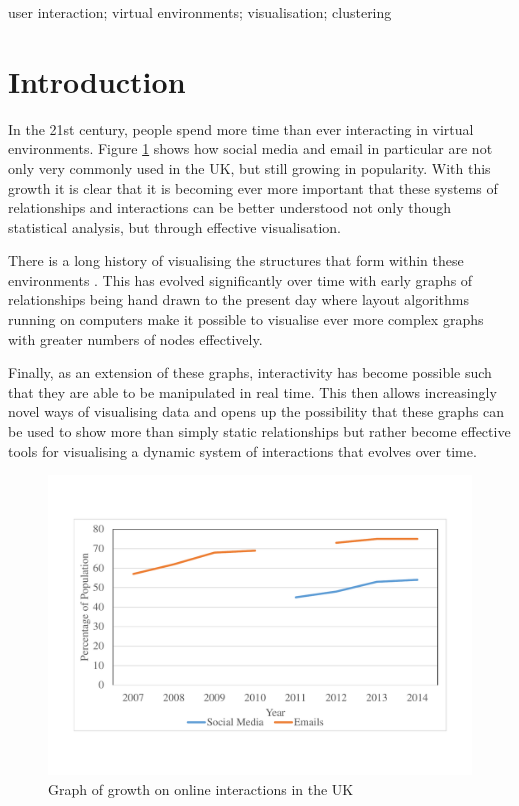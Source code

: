 \documentclass[12pt,a4paper]{article}
\begin{document}
\begin{keywords}
user interaction; virtual environments; visualisation; clustering
\end{keywords}

\section{Introduction}

\noindent   
In the 21st century, people spend more time than ever interacting in virtual environments. Figure \ref{fig:interactions} shows how social media and email in particular are not only very commonly used in the UK, but still growing in popularity. With this growth it is clear that it is becoming ever more important that these systems of relationships and interactions can be better understood not only though statistical analysis, but through effective visualisation.

There is a long history of visualising the structures that form within these environments \cite{freeman2000visualizing}. This has evolved significantly over time with early graphs of relationships being hand drawn to the present day where layout algorithms running on computers make it possible to visualise ever more complex graphs with greater numbers of nodes effectively. 

Finally, as an extension of these graphs, interactivity has become possible such that they are able to be manipulated in real time. This then allows increasingly novel ways of visualising data and opens up the possibility that these graphs can be used to show more than simply static relationships but rather become effective tools for visualising a dynamic system of interactions that evolves over time.

\begin{figure}[htb]
\centering
\caption{Graph of growth on online interactions in the UK \protect\cite{ons}}
\label{fig:interactions}
\includegraphics[scale=0.4]{Chart.pdf}
\end{figure}
\end{document}

